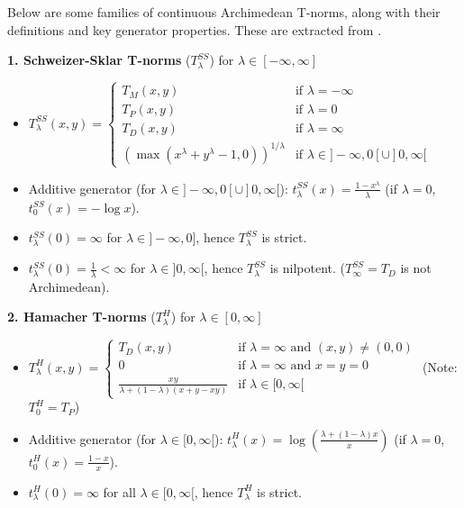 \begin{example}\label{ex:families_tnorms}
    Below are some families of continuous Archimedean T-norms, along with their definitions and key generator properties. These are extracted from \cite[App.~A]{Klement2000}.

    \textbf{1. Schweizer-Sklar T-norms} ($T_\lambda^{SS}$) for $\lambda \in [-\infty, \infty]$ 
\begin{itemize}
    \item $T_\lambda^{SS}(x,y) = \begin{cases} T_M(x,y) & \text{if } \lambda = -\infty \\ T_P(x,y) & \text{if } \lambda = 0 \\ T_D(x,y) & \text{if } \lambda = \infty \\ (\max(x^\lambda + y^\lambda - 1, 0))^{1/\lambda} & \text{if } \lambda \in ]-\infty, 0[ \cup ]0, \infty[ \end{cases}$
    \item Additive generator (for $\lambda \in ]-\infty, 0[ \cup ]0, \infty[$): $t_\lambda^{SS}(x) = \frac{1-x^\lambda}{\lambda}$ (if $\lambda=0$, $t_0^{SS}(x) = -\log x$).
    \item $t_\lambda^{SS}(0) = \infty$ for $\lambda \in ]-\infty, 0]$, hence $T_\lambda^{SS}$ is strict.
    \item $t_\lambda^{SS}(0) = \frac{1}{\lambda} < \infty$ for $\lambda \in ]0, \infty[$, hence $T_\lambda^{SS}$ is nilpotent. ($T_\infty^{SS} = T_D$ is not Archimedean).
\end{itemize}

\textbf{2. Hamacher T-norms} ($T_\lambda^H$) for $\lambda \in [0, \infty]$ 
\begin{itemize}
    \item $T_\lambda^H(x,y) = \begin{cases} T_D(x,y) & \text{if } \lambda = \infty \text{ and } (x,y) \neq (0,0) \\ 0 & \text{if } \lambda = \infty \text{ and } x=y=0 \\ \frac{xy}{\lambda + (1-\lambda)(x+y-xy)} & \text{if } \lambda \in [0, \infty[ \end{cases}$
    (Note: $T_0^H = T_P$)
    \item Additive generator (for $\lambda \in [0, \infty[$): $t_\lambda^H(x) = \log\left(\frac{\lambda + (1-\lambda)x}{x}\right)$ (if $\lambda=0$, $t_0^H(x)=\frac{1-x}{x}$).
    \item $t_\lambda^H(0) = \infty$ for all $\lambda \in [0, \infty[$, hence $T_\lambda^H$ is strict.
\end{itemize}


\end{example}
